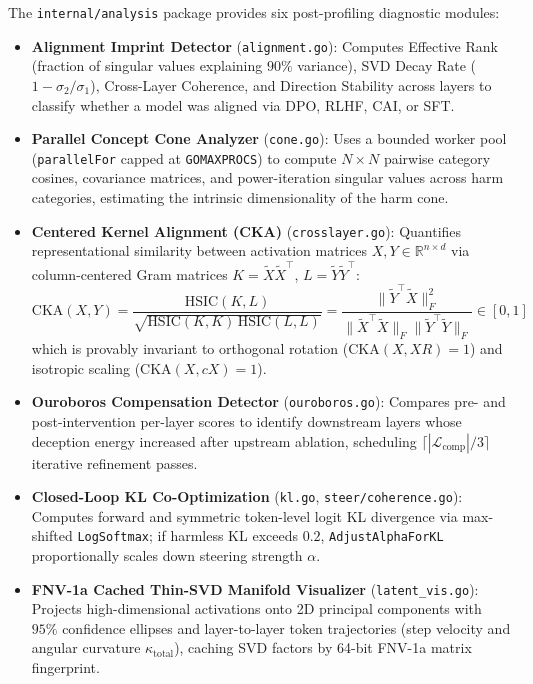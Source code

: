 \documentclass{article}
\begin{document}
The \texttt{internal/analysis} package provides six post-profiling diagnostic modules:
\begin{itemize}
    \item \textbf{Alignment Imprint Detector} (\texttt{alignment.go}): Computes Effective Rank (fraction of singular values explaining $90\%$ variance), SVD Decay Rate ($1 - \sigma_2/\sigma_1$), Cross-Layer Coherence, and Direction Stability across layers to classify whether a model was aligned via DPO, RLHF, CAI, or SFT.
    \item \textbf{Parallel Concept Cone Analyzer} (\texttt{cone.go}): Uses a bounded worker pool (\texttt{parallelFor} capped at \texttt{GOMAXPROCS}) to compute $N \times N$ pairwise category cosines, covariance matrices, and power-iteration singular values across harm categories, estimating the intrinsic dimensionality of the harm cone.
    \item \textbf{Centered Kernel Alignment (CKA)} (\texttt{crosslayer.go}): Quantifies representational similarity between activation matrices $X, Y \in \mathbb{R}^{n \times d}$ via column-centered Gram matrices $K = \tilde{X}\tilde{X}^\top$, $L = \tilde{Y}\tilde{Y}^\top$:
    \begin{equation}
        \text{CKA}(X, Y) = \frac{\text{HSIC}(K, L)}{\sqrt{\text{HSIC}(K, K)\,\text{HSIC}(L, L)}} = \frac{\|\tilde{Y}^\top \tilde{X}\|_F^2}{\|\tilde{X}^\top \tilde{X}\|_F \|\tilde{Y}^\top \tilde{Y}\|_F} \in [0, 1]
    \end{equation}
    which is provably invariant to orthogonal rotation ($\text{CKA}(X, XR) = 1$) and isotropic scaling ($\text{CKA}(X, cX) = 1$).
    \item \textbf{Ouroboros Compensation Detector} (\texttt{ouroboros.go}): Compares pre- and post-intervention per-layer scores to identify downstream layers whose deception energy increased after upstream ablation, scheduling $\lceil |\mathcal{L}_{\text{comp}}| / 3 \rceil$ iterative refinement passes.
    \item \textbf{Closed-Loop KL Co-Optimization} (\texttt{kl.go}, \texttt{steer/coherence.go}): Computes forward and symmetric token-level logit KL divergence via max-shifted \texttt{LogSoftmax}; if harmless KL exceeds $0.2$, \texttt{AdjustAlphaForKL} proportionally scales down steering strength $\alpha$.
    \item \textbf{FNV-1a Cached Thin-SVD Manifold Visualizer} (\texttt{latent\_vis.go}): Projects high-dimensional activations onto 2D principal components with $95\%$ confidence ellipses and layer-to-layer token trajectories (step velocity and angular curvature $\kappa_{\text{total}}$), caching SVD factors by 64-bit FNV-1a matrix fingerprint.
\end{itemize}
\end{document}
